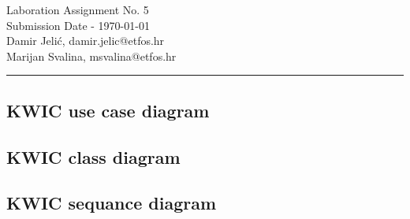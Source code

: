 \documentclass[11pt,a4paper]{article}
\begin{document}
\large
Laboration Assignment No. 5 \\
Submission Date - \yyyymmdddate \today \\
Damir Jelić, damir.jelic@etfos.hr \\
Marijan Svalina, msvalina@etfos.hr
\\
\rule{\linewidth}{0.1mm}
\setcounter{section}{5}
\subsection{KWIC use case diagram}

\subsection{KWIC class diagram}

\subsection{KWIC sequance diagram}
\end{document}
